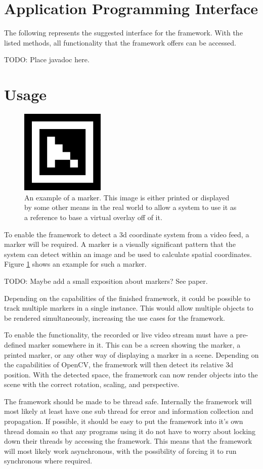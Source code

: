 \section{Application Programming Interface}

The following represents the suggested interface for the framework.
With the listed methods, all functionality that the framework offers can be accessed.

TODO: Place javadoc here.

\section{Usage}

\begin{figure}
	\centering
	\includegraphics[width=4cm]{img/marker_example.png}
	\caption[Example Marker.]{An example of a marker. This image is either printed or displayed by some other means in the real world to allow a system to use it as a reference to base a virtual overlay off of it.}
	\label{fig:marker_example}
\end{figure}

To enable the framework to detect a 3d coordinate system from a video feed, a marker will be required.
A marker is a visually significant pattern that the system can detect within an image and be used to calculate spatial coordinates. Figure \ref{fig:marker_example} shows an example for such a marker.

TODO: Maybe add a small exposition about markers? See paper.

Depending on the capabilities of the finished framework, it could be possible to track multiple markers in a single instance.
This would allow multiple objects to be rendered simultaneously, increasing the use cases for the framework.

To enable the functionality, the recorded or live video stream must have a pre-defined marker somewhere in it.
This can be a screen showing the marker, a printed marker, or any other way of displaying a marker in a scene.
Depending on the capabilities of OpenCV, the framework will then detect its relative 3d position.
With the detected space, the framework can now render objects into the scene with the correct rotation, scaling, and perspective.

The framework should be made to be thread safe.
Internally the framework will most likely at least have one sub thread for error and information collection and propagation.
If possible, it should be easy to put the framework into it's own thread domain so that any programs using it do not have to worry about locking down their threads by accessing the framework.
This means that the framework will most likely work asynchronous, with the possibility of forcing it to run synchronous where required.

